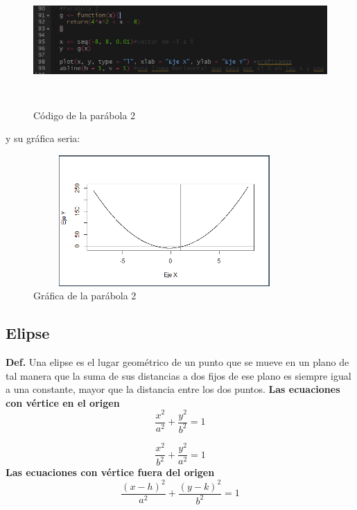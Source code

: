 \documentclass{article}
\begin{document}
\begin{figure}[h]
    \centering
    \includegraphics[width=12cm, height=5cm]{Codigopara2}
    \caption{Código de la parábola 2}
    \label{fig:mesh11}
\end{figure}
y su gráfica seria:
\begin{figure}[h]
    \centering
    \includegraphics[width=10cm, height=5cm]{Grafica6}
    \caption{Gráfica de la parábola 2}
    \label{fig:mesh12}
\end{figure}

\subsection{Elipse}
\textbf{Def.} Una elipse es el lugar geométrico de un punto que se mueve en un plano de tal manera que la suma de sus distancias a dos fijos de ese plano es siempre igual a una constante, mayor que la distancia entre los dos puntos.
\newline
\textbf{Las ecuaciones con vértice en el origen}
\begin{equation}
    \frac{x^2}{a^2} + \frac{y^2}{b^2} = 1
\end{equation}

\begin{equation}
    \frac{x^2}{b^2} + \frac{y^2}{a^2} = 1
\end{equation}
\newline
\textbf{Las ecuaciones con vértice fuera del origen}
\begin{equation}
    \frac{(x-h)^2}{a^2} + \frac{(y-k)^2}{b^2} = 1
\end{equation}
\end{document}

